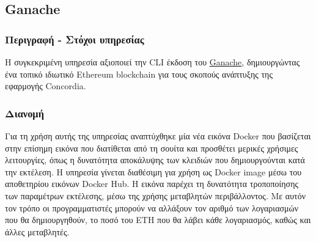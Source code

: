 \subsection{Ganache} \label{subsection:4-3-6-ganache-service}

\subsubsection{Περιγραφή - Στόχοι υπηρεσίας}

Η συγκεκριμένη υπηρεσία αξιοποιεί την CLI έκδοση του \hyperref[subsection:4-2-3-2-ganache]{Ganache}, δημιουργώντας ένα τοπικό ιδιωτικό Ethereum blockchain για τους σκοπούς ανάπτυξης της εφαρμογής Concordia.

\subsubsection{Διανομή}

Για τη χρήση αυτής της υπηρεσίας αναπτύχθηκε μία νέα εικόνα Docker που βασίζεται στην επίσημη εικόνα που διατίθεται από τη σουίτα και προσθέτει μερικές χρήσιμες λειτουργίες, όπως η δυνατότητα αποκάλυψης των κλειδιών που δημιουργούνται κατά την εκτέλεση. Η υπηρεσία γίνεται διαθέσιμη για χρήση ως Docker image μέσω του αποθετηρίου εικόνων Docker Hub. Η εικόνα παρέχει τη δυνατότητα τροποποίησης των παραμέτρων εκτέλεσης, μέσω της χρήσης μεταβλητών περιβάλλοντος. Με αυτόν τον τρόπο οι προγραμματιστές μπορούν να αλλάξουν τον αριθμό των λογαριασμών που θα δημιουργηθούν, το ποσό του ETH που θα λάβει κάθε λογαριασμός, καθώς και άλλες μεταβλητές.
